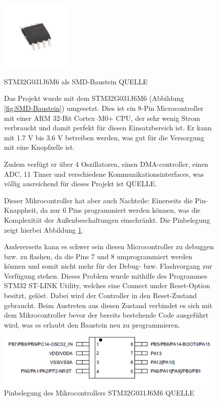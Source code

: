 \documentclass[a4paper,
DIV=13,
12pt,
BCOR=10mm,
department=FakEI,
parskip=half,
automark,
]{article}
\begin{document}
\begin{figure}[!hbpt]
 \begin{center} \includegraphics[width=0.3\textwidth]{s-l225.jpg}
 \caption{STM32G031J6M6 als SMD-Baustein QUELLE}
 \label{fig:SMD-Baustein}
  \end{center}

Das Projekt wurde mit dem STM32G031J6M6 (Abbildung \ref{fig:SMD-Baustein}) umgesetzt. Dies ist ein 8-Pin Microcontroller  mit einer ARM 32-Bit Cortex–M0+ CPU, der sehr wenig Strom verbraucht und damit perfekt für diesen Einsatzbereich ist. Er kann mit 1.7 V bis 3.6 V betreiben werden, was gut für die Versorgung mit eine Knopfzelle ist. 

Zudem verfügt er über 4 Oszillatoren, einen DMA-controller, einen ADC, 11 Timer und verschiedene Kommunikationsinterfaces, was völlig ausreichend für dieses Projekt ist QUELLE. 

Dieser Mikrocontroller hat aber auch Nachteile: Einerseits die Pin-Knappheit, da nur 6 Pins programmiert werden können, was die Komplexität der Außenbeschaltungen einschränkt. Die Pinbelegung zeigt hierbei Abbildung \ref{fig:Pinbelegung}.

Andererseits kann es schwer sein diesen Microcontroller zu debuggen bzw. zu flashen, da die Pins 7 und 8 umprogrammiert werden können und somit nicht mehr für der Debug- bzw. Flashvorgang zur Verfügung stehen. Dieses Problem wurde mithilfe des Programmes STM32 ST-LINK Utility, welches eine \glqq Connect under Reset\grqq{}-Option besitzt, gelöst. Dabei wird der Controller in den Reset-Zustand gebraucht. Beim Austreten aus diesen Zustand verbindet es sich mit dem Mikrocontroller bevor der bereits bestehende Code ausgeführt wird, was es erlaubt den Baustein neu zu programmieren.

   \begin{center} \includegraphics[width=1\textwidth]{Stm32g031j6m6.png}
 \caption{Pinbelegung des Mikrocontrollers STM32G031J6M6 QUELLE}
 \label{fig:Pinbelegung}
  \end{center}  
\end{figure}
\end{document}
